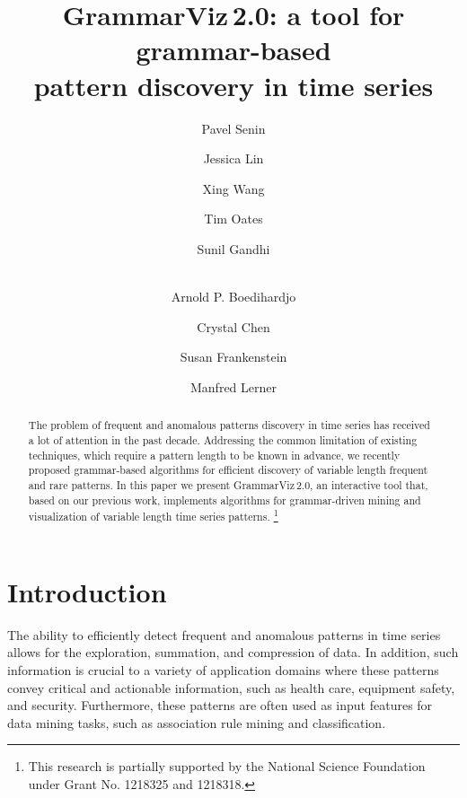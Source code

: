 \documentclass{llncs}
\title{\mbox{GrammarViz\,2.0}: a tool for grammar-based\\ pattern discovery in time series}
\newcommand\blfootnote[1]{%
  \begingroup
  \renewcommand\thefootnote{}\footnote{#1}%
  \addtocounter{footnote}{-1}%
  \endgroup
}
\begin{document}
 

\author{
Pavel Senin \and 
Jessica Lin  \and Xing Wang  \and 
Tim Oates \and Sunil Gandhi \and \\ 
Arnold P. Boedihardjo \and Crystal Chen \and Susan Frankenstein 
\and Manfred Lerner }


\maketitle

\begin{abstract}
The problem of frequent and anomalous patterns discovery in time series has received a lot of attention in the past decade. Addressing the common limitation of existing techniques, which require a pattern length to be known in advance, we recently proposed grammar-based algorithms for efficient discovery of variable length frequent and rare patterns. In this paper we present \mbox{GrammarViz\,2.0}, an interactive tool that, based on our previous work, implements algorithms for grammar-driven mining and visualization of variable length time series patterns.\blfootnote{This research is partially supported by the National Science Foundation under Grant No. 1218325 and 1218318.}
\end{abstract}

\section{Introduction}
The ability to efficiently detect frequent and anomalous patterns in time series allows for the exploration, summation, and compression of data. In addition, such information is crucial to a variety of application domains where these patterns convey critical and actionable information, such as health care, equipment safety, and security. Furthermore, these patterns are often used as input features for data mining tasks, such as association rule mining and classification. %
\end{document}
